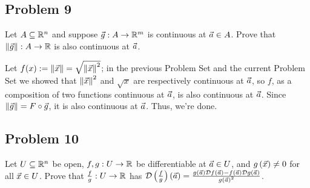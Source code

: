 \documentclass[main.tex]{subfiles}
\begin{document}
\subsection{Problem 9}
\begin{claim}
    Let $A \subseteq \mathbb R^n$ and suppose $\vec{g} : A \to \mathbb R^m$ is continuous at $\vec{a} \in A$. Prove that $\left\lVert \vec{g} \right\rVert : A \to \mathbb R$ is also continuous at $\vec{a}$.
\end{claim}

\begin{soln}
    Let $f(x):= \left\lVert \vec{x} \right\rVert = \sqrt{\left\lVert \vec{x} \right\rVert^2}$; in the previous Problem Set and the current Problem Set we showed that $\left\lVert \vec{x} \right\rVert^2$ and $\sqrt{x}$ are respectively continuous at $\vec{a}$, so $f$, as a composition of two functions continuous at $\vec{a}$, is also continuous at $\vec{a}$. Since $\left\lVert \vec{g} \right\rVert = F\circ \vec{g}$, it is also continuous at $\vec{a}$. Thus, we're done.
\end{soln}
\eject

\subsection{Problem 10}
\begin{claim}
    Let $U \subseteq \mathbb R^n$ be open, $f, g : U \to \mathbb R$ be differentiable at $\vec{a} \in U$, and $g\left( \vec{x} \right) \neq 0$ for all $\vec{x} \in U$. Prove that $\frac{f}{g} : U \to \mathbb R$ has $\mathcal{D}\left( \frac{f}{g} \right)\left( \vec{a} \right) = \frac{g(\vec{a})\mathcal{D}f\left( \vec{a} \right) -f\left( \vec{a} \right)\mathcal{D}g\left( \vec{a} \right)}{g\left( \vec{a} \right)^{2}}$.
\end{claim}
\end{document}
